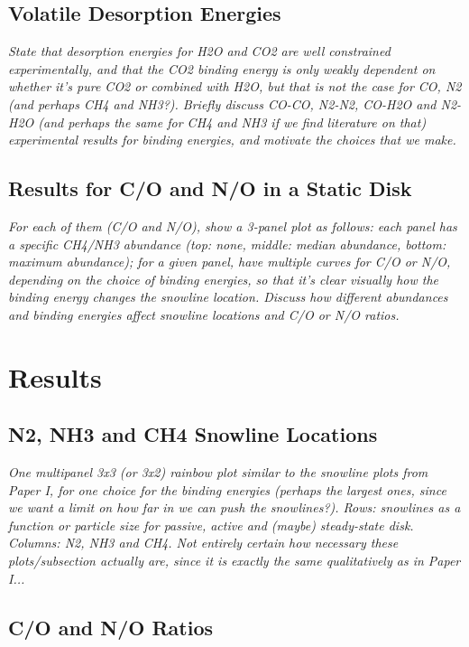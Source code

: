 \documentclass[apj]{emulateapj}
\newcommand{\emgr}[1]{\emph{ \color{gray} #1}}
\begin{document}
\subsection{Volatile Desorption Energies}

\emgr{State that desorption energies for H2O and CO2 are well constrained experimentally, and that the CO2 binding energy is only weakly dependent on whether it's pure CO2 or combined with H2O, but that is not the case for CO, N2 (and perhaps CH4 and NH3?). Briefly discuss CO-CO, N2-N2, CO-H2O and N2-H2O (and perhaps the same for CH4 and NH3 if we find literature on that) experimental results for binding energies, and motivate the choices that we make.}

\subsection{Results for C/O and N/O in a Static Disk}

\emgr{For each of them (C/O and N/O), show a 3-panel plot as follows: each panel has a specific CH4/NH3 abundance (top: none, middle: median abundance, bottom: maximum abundance); for a given panel, have multiple curves for C/O or N/O, depending on the choice of binding energies, so that it's clear visually how the binding energy changes the snowline location. Discuss how different abundances  and binding energies affect snowline locations and C/O or N/O ratios.}
\section{Results}

\subsection{N2, NH3 and CH4 Snowline Locations}

\emgr{One multipanel 3x3 (or 3x2) rainbow plot similar to the snowline plots from Paper I, for \textit{one} choice for the binding energies (perhaps the largest ones, since we want a limit on how far in we can push the snowlines?). Rows: snowlines as a function or particle size for passive, active and (maybe) steady-state disk. Columns: N2, NH3 and CH4. Not entirely certain how necessary these plots/subsection actually are, since it is exactly the same qualitatively as in Paper I...}

\subsection{C/O and N/O Ratios}
\end{document}
